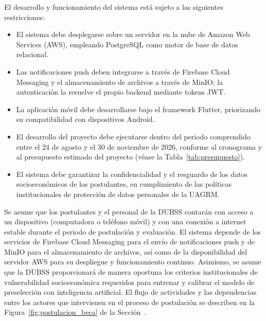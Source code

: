 \label{sec:ieee_restricciones}

El desarrollo y funcionamiento del sistema está sujeto a las siguientes restricciones:

\begin{itemize}
    \item El sistema debe desplegarse sobre un servidor en la nube de Amazon Web Services (AWS), empleando PostgreSQL como motor de base de datos relacional.
    \item Las notificaciones push deben integrarse a través de Firebase Cloud Messaging y el almacenamiento de archivos a través de MinIO; la autenticación la resuelve el propio backend mediante tokens JWT.
    \item La aplicación móvil debe desarrollarse bajo el framework Flutter, priorizando su compatibilidad con dispositivos Android.
    \item El desarrollo del proyecto debe ejecutarse dentro del periodo comprendido entre el 24 de agosto y el 30 de noviembre de 2026, conforme al cronograma y al presupuesto estimado del proyecto (véase la Tabla~\ref{tab:presupuesto}).
    \item El sistema debe garantizar la confidencialidad y el resguardo de los datos socioeconómicos de los postulantes, en cumplimiento de las políticas institucionales de protección de datos personales de la UAGRM.
\end{itemize}

\label{sec:ieee_suposiciones}

Se asume que los postulantes y el personal de la DUBSS contarán con acceso a un dispositivo (computadora o teléfono móvil) y con una conexión a internet estable durante el periodo de postulación y evaluación. El sistema depende de los servicios de Firebase Cloud Messaging para el envío de notificaciones push y de MinIO para el almacenamiento de archivos, así como de la disponibilidad del servidor AWS para su despliegue y funcionamiento continuo. Asimismo, se asume que la DUBSS proporcionará de manera oportuna los criterios institucionales de vulnerabilidad socioeconómica requeridos para entrenar y calibrar el modelo de preselección con inteligencia artificial. El flujo de actividades y las dependencias entre los actores que intervienen en el proceso de postulación se describen en la Figura~\ref{fig:postulacion_beca} de la Sección~.

